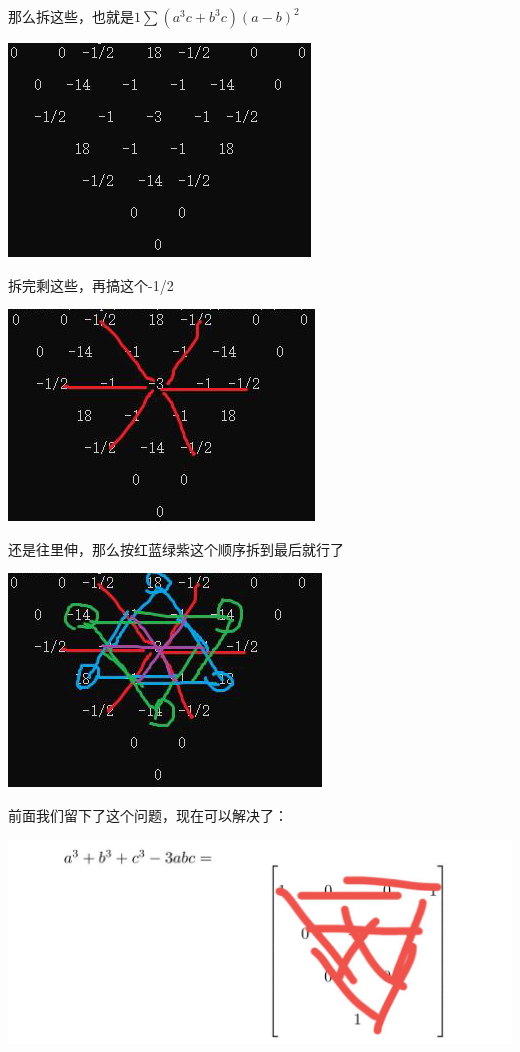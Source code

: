 \documentclass[UTF8]{ctexart}
\begin{document}
那么拆这些，也就是$ 1\displaystyle \sum (a^3c+b^3c)(a-b)^2 $
\begin{center}
	\includegraphics[width=0.5\linewidth]{42}
\end{center}
拆完剩这些，再搞这个-1/2
\begin{center}
	\includegraphics[width=0.5\linewidth]{43}
\end{center}
还是往里伸，那么按红蓝绿紫这个顺序拆到最后就行了
\begin{center}
	\includegraphics[width=0.5\linewidth]{44}
\end{center}
\pageref{1}\label{2}前面我们留下了这个问题，现在可以解决了：
\begin{center}
	\includegraphics[width=0.7\linewidth]{441}
\end{center}
\end{document}

